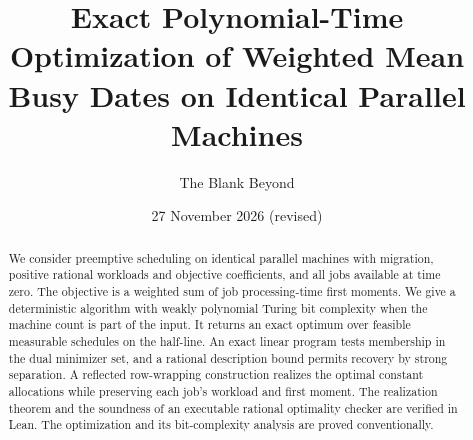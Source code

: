 \documentclass[11pt]{amsart}
\title[Exact optimization of weighted mean busy dates]{Exact Polynomial-Time Optimization of Weighted Mean Busy Dates on Identical Parallel Machines}
\author{The Blank Beyond}
\date{27 November 2026 (revised)}
\begin{document}
\begin{abstract}
We consider preemptive scheduling on identical parallel machines with migration, positive rational workloads and objective coefficients, and all jobs available at time zero. The objective is a weighted sum of job processing-time first moments. We give a deterministic algorithm with weakly polynomial Turing bit complexity when the machine count is part of the input. It returns an exact optimum over feasible measurable schedules on the half-line. An exact linear program tests membership in the dual minimizer set, and a rational description bound permits recovery by strong separation. A reflected row-wrapping construction realizes the optimal constant allocations while preserving each job's workload and first moment. The realization theorem and the soundness of an executable rational optimality checker are verified in Lean. The optimization and its bit-complexity analysis are proved conventionally.
\end{abstract}
\maketitle









\appendix




\end{document}
